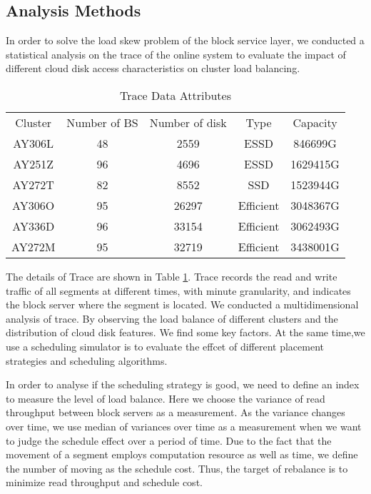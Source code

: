 
\subsection{Analysis Methods}
\label{sec2.3}
In order to solve the load skew problem of the block service layer, we conducted a statistical analysis on the trace of the online system to evaluate the impact of different cloud disk access characteristics on cluster load balancing.
\begin{table}[ht]
    \footnotesize
    \centering
    \begin{tabular}{c|c|c|c|c}
         Cluster & Number of BS & Number of disk & Type & Capacity\\
         AY306L & 48 & 2559 & ESSD & 846699G\\
         AY251Z & 96 & 4696 & ESSD & 1629415G\\
         AY272T & 82 & 8552 & SSD & 1523944G\\
         AY306O & 95 & 26297 & Efficient & 3048367G\\
         AY336D & 96 & 33154 & Efficient & 3062493G\\
         AY272M & 95 & 32719 & Efficient & 3438001G\\
    \end{tabular}
    \caption{Trace Data Attributes}
    \label{table2.3-1}
\end{table}
The details of Trace are shown in Table \ref{table2.3-1}. Trace records the read and write traffic of all segments at different times, with minute granularity, and indicates the block server where the segment is located. We conducted a multidimensional analysis of trace. By observing the load balance of different clusters and the distribution of cloud disk features. We find some key factors.
At the same time,we use a scheduling simulator is to evaluate the effcet of different placement strategies and scheduling algorithms.

In order to analyse if the scheduling strategy is good, we need to define an index to measure the level of load balance. Here we choose the variance of read throughput between block servers as a measurement. As the variance changes over time, we use median of variances over time as a measurement when we want to judge the schedule effect over a period of time. Due to the fact that the movement of a segment employs computation resource as well as time, we define the number of moving as the schedule cost. Thus, the target of rebalance is to minimize read throughput and schedule cost.

